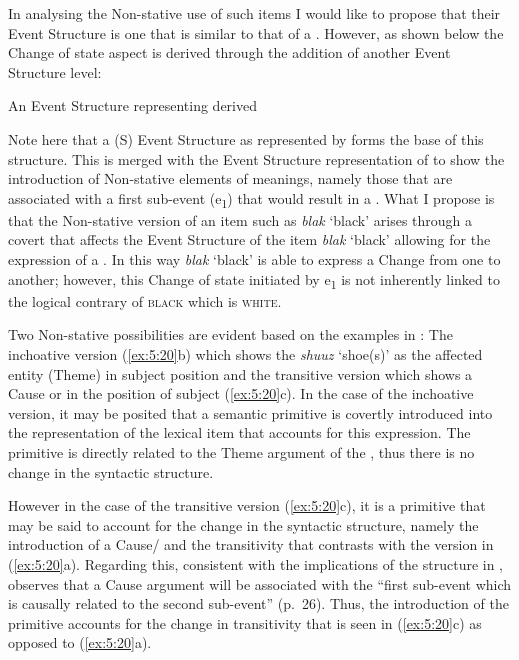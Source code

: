 In analysing the Non-stative use of such items I would like to propose that their Event Structure is one that is similar to that of a . However, as shown below the Change of state aspect is derived through the addition of another Event Structure level:

\ea\label{ex:5:24}
 An Event Structure representing derived 
\begin{center}
\end{center}
\z

Note here that a  (S) Event Structure as represented by \citet{Pustejovsky1991} forms the base of this structure. This is merged with the Event Structure representation of  to show the introduction of Non-stative elements of meanings, namely those that are associated with a first sub-event (e\textsubscript{1}) that would result in a . What I propose is that the Non-stative version of an item such as \textit{blak} `black' arises through a covert  that affects the Event Structure of the  item \textit{blak} `black' allowing for the expression of a . In this way \textit{blak} `black' is able to express a Change from one  to another; however, this Change of state initiated by e\textsubscript{1} is not inherently linked to the logical contrary of \textsc{black} which is \textsc{white}. 

Two Non-stative possibilities are evident based on the examples in : The inchoative version (\ref{ex:5:20}b) which shows the \textit{shuuz}  `shoe(s)’ as the affected entity (Theme) in subject position and the transitive version which shows a Cause or  in the position of subject (\ref{ex:5:20}c). In the case of the inchoative version, it may be posited that a semantic primitive \BECOME is covertly introduced into the representation of the lexical item that accounts for this expression. The primitive \BECOME is directly related to the Theme argument of the , thus there is no change in the syntactic structure. 

However in the case of the transitive version (\ref{ex:5:20}c), it is a \CAUSE primitive that may be said to account for the change in the syntactic structure, namely the introduction of a Cause\slash {} and the transitivity that contrasts with the  version in (\ref{ex:5:20}a). Regarding this, consistent with the implications of the structure in , \citet{Grimshaw1990} observes that a Cause argument will be associated with the ``first sub-event which is causally related to the second sub-event'' (p.~26). Thus, the introduction of the primitive \CAUSE accounts for the change in transitivity that is seen in (\ref{ex:5:20}c) as opposed to (\ref{ex:5:20}a).

